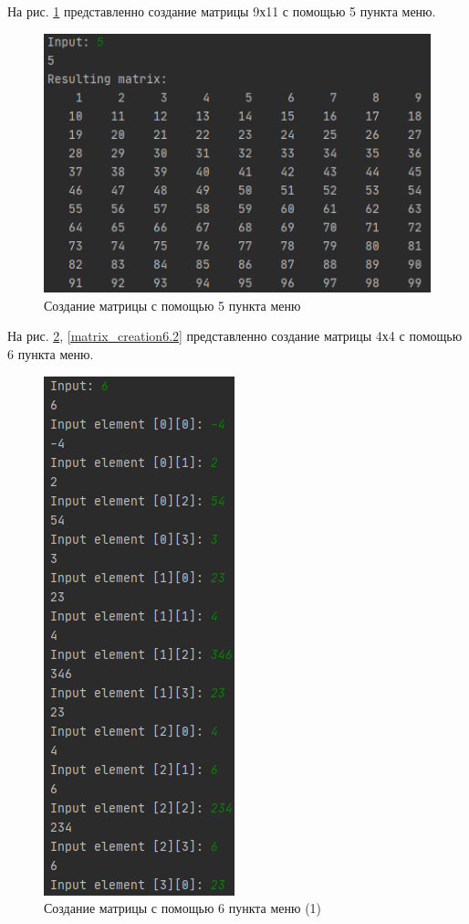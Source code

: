 На рис. \ref{matrix_creation5} представленно создание матрицы 9х11 с помощью 5 пункта меню.

\begin{figure}[hpt!]
	\centering
	\includegraphics[width=0.6\linewidth]{photo/matrix_creation5}
	\caption{Создание матрицы с помощью 5 пункта меню}
	\label{matrix_creation5}
\end{figure}

\newpage

На рис. \ref{matrix_creation6.1}, \ref{matrix_creation6.2} 
представленно создание матрицы 4х4 с помощью 6 пункта меню.

\begin{figure}[hpt!]
	\centering
	\includegraphics[width=0.5\linewidth]{photo/matrix_creation6.1}
	\caption{Создание матрицы с помощью 6 пункта меню (1)}
	\label{matrix_creation6.1}
\end{figure}

